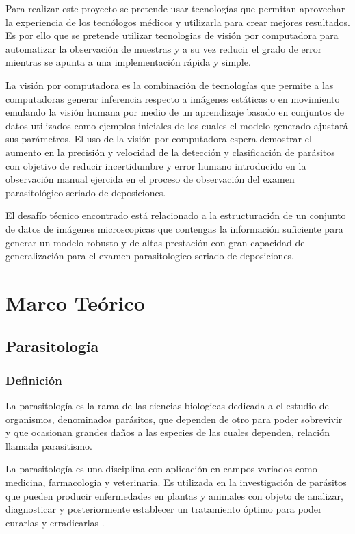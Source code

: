 \documentclass[letter,12pt]{report}
\begin{document}
    Para realizar este proyecto se pretende usar tecnologías que permitan aprovechar la
    experiencia de los tecnólogos médicos y utilizarla para crear mejores resultados.
    Es por ello que se pretende utilizar tecnologias de visión por computadora para
    automatizar la observación de muestras y a su vez reducir el grado de error mientras
    se apunta a una implementación rápida y simple.

    La visión por computadora es la combinación de tecnologías que permite a las
    computadoras generar inferencia respecto a imágenes estáticas o en movimiento
    emulando la visión humana por medio de un aprendizaje basado en conjuntos de datos
    utilizados como ejemplos iniciales de los cuales el modelo generado ajustará sus
    parámetros. %
    El uso de la visión por computadora espera demostrar el aumento en la precisión y
    velocidad de la detección y clasificación de parásitos con objetivo de reducir
    incertidumbre y error humano introducido en la observación manual ejercida en el proceso
    de observación del examen parasitológico seriado de deposiciones. 

    El desafío técnico encontrado está relacionado a la estructuración de un conjunto de
    datos de imágenes microscopicas que contengas la información suficiente para generar
    un modelo robusto y de altas prestación con gran capacidad de generalización para el
    examen parasitologico seriado de deposiciones.


\chapter{Marco Teórico}\label{teorico}

\section{Parasitología}
\subsection{Definición}
La parasitología es la rama de las ciencias biologicas dedicada a el estudio de
organismos, denominados parásitos, que dependen de otro para poder sobrevivir y que
ocasionan grandes daños a las especies de las cuales dependen, relación llamada
parasitismo.

La parasitología es una disciplina con aplicación en campos variados como medicina,
farmacologia y veterinaria. Es utilizada en la investigación de parásitos que pueden
producir enfermedades en plantas y animales con objeto de analizar, diagnosticar y
posteriormente establecer un tratamiento óptimo para poder curarlas y
erradicarlas \cite{Paras}.
\end{document}
